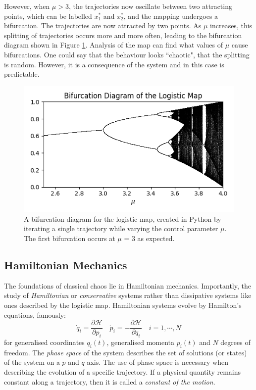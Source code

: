 \documentclass[12pt,a4paper]{amsart}
\begin{document}

However, when $\mu > 3$, the trajectories now oscillate between two attracting points, which can be labelled $x_{1}^{*}$ and $x_{2}^{*}$, and the mapping undergoes a bifurcation. The trajectories are now attracted by two points. As $\mu$ increases, this splitting of trajectories occurs more and more often, leading to the bifurcation diagram shown in Figure \ref{fig:bif}. Analysis of the map can find what values of $\mu$ cause bifurcations. One could say that the behaviour looks ``chaotic", that the splitting is random. However, it is a consequence of the system and in this case is predictable.

\begin{figure}[h] 
    \centering
    \includegraphics[scale=0.8]{logistic_map_bifur.png}
    \caption{A bifurcation diagram for the logistic map, created in Python by iterating a single trajectory while varying the control parameter $\mu$. The first bifurcation occurs at $\mu$ = 3 as expected.}
    \label{fig:bif}
\end{figure}

\newpage

\subsection{Hamiltonian Mechanics}

The foundations of classical chaos lie in Hamiltonian mechanics. Importantly, the study of \textit{Hamiltonian} or \textit{conservative} systems rather than dissipative systems like ones described by the logistic map. Hamiltonian systems evolve by Hamilton's equations, famously:
$$\dot{q}_{i} = \frac{\partial \mathcal{H}}{\partial p_{i}} \quad \dot{p}_{i} = -\frac{\partial \mathcal{H}}{\partial q_{i}} \quad i = 1, \cdots , N$$
for generalised coordinates $q_{i}(t)$, generalised momenta $p_{i}(t)$ and $N$ degrees of freedom. The \textit{phase space} of the system describes the set of solutions (or states) of the system on a $p$ and $q$ axis. The use of phase space is necessary when describing the evolution of a specific trajectory. If a physical quantity remains constant along a trajectory, then it is called a \textit{constant of the motion}. 
\end{document}
